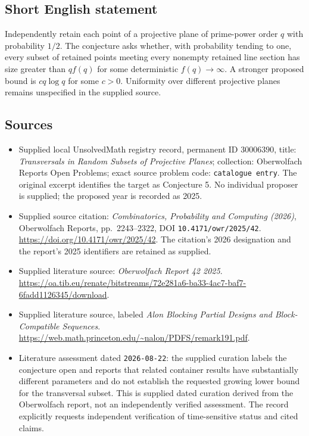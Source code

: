 \documentclass[11pt]{article}
\begin{document}
\subsection{Short English statement}
Independently retain each point of a projective plane of prime-power order \(q\) with probability \(1/2\). The conjecture asks whether, with probability tending to one, every subset of retained points meeting every nonempty retained line section has size greater than \(qf(q)\) for some deterministic \(f(q)\to\infty\). A stronger proposed bound is \(c q\log q\) for some \(c>0\). Uniformity over different projective planes remains unspecified in the supplied source.
\subsection{Sources}
\begin{itemize}
\item Supplied local UnsolvedMath registry record, permanent ID \(30006390\), title: \emph{Transversals in Random Subsets of Projective Planes}; collection: Oberwolfach Reports Open Problems; exact source problem code: \texttt{catalogue entry}. The original excerpt identifies the target as Conjecture 5. No individual proposer is supplied; the proposed year is recorded as 2025.
\item Supplied source citation: \emph{Combinatorics, Probability and Computing (2026)}, Oberwolfach Reports, pp.\ 2243--2322, DOI \texttt{10.4171/owr/2025/42}. \url{https://doi.org/10.4171/owr/2025/42}. The citation's 2026 designation and the report's 2025 identifiers are retained as supplied.
\item Supplied literature source: \emph{Oberwolfach Report 42 2025}. \url{https://oa.tib.eu/renate/bitstreams/72e281a6-ba33-4ac7-baf7-6fadd1126345/download}.
\item Supplied literature source, labeled \emph{Alon Blocking Partial Designs and Block-Compatible Sequences}. \url{https://web.math.princeton.edu/~nalon/PDFS/remark191.pdf}.
\item Literature assessment dated \texttt{2026-08-22}: the supplied curation labels the conjecture open and reports that related container results have substantially different parameters and do not establish the requested growing lower bound for the transversal subset. This is supplied dated curation derived from the Oberwolfach report, not an independently verified assessment. The record explicitly requests independent verification of time-sensitive status and cited claims.
\end{itemize}
\end{document}
